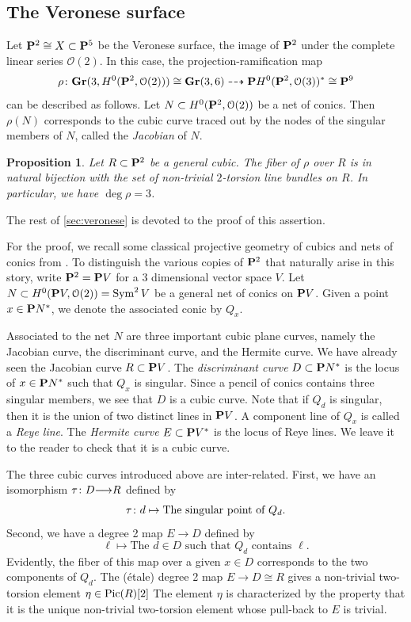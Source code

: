 \documentclass[11pt,reqno]{amsart}
\theoremstyle{plain}
\newtheorem{proposition}[theorem]{Proposition}
\theoremstyle{definition}
\theoremstyle{remark}
\numberwithin{equation}{section}
\renewcommand{\to}{{\longrightarrow}}
\numberwithin{equation}{section}
\renewcommand{\O}{\mathcal O}
\begin{document}
\subsection{The Veronese surface} %
\label{sec:veronese}
Let $\P^{2} \cong X \subset \P^{5}$ be the Veronese surface, the image of $\P^2$ under the complete linear series $\O(2)$.
In this case, the projection-ramification map
\begin{align*}
  \rho \from  \Gr(3,H^0(\P^2, \O(2))) \cong \Gr(3, 6) \dashrightarrow \P H^0(\P^2, \O(3))^* \cong \P^9
\end{align*}
can be described as follows.
Let $N \subset H^0(\P^2, \O(2))$ be a net of conics.
Then $\rho(N)$ corresponds to the cubic curve traced out by the nodes of the singular members of $N$, called the \emph{Jacobian} of $N$.
\begin{proposition}\label{prop:veronese}
  Let $R \subset \P^2$ be a general cubic.
  The fiber of $\rho$ over $R$ is in natural bijection with the set of non-trivial $2$-torsion line bundles on $R$.
  In particular, we have $\deg \rho = 3$.
\end{proposition}
The rest of \autoref{sec:veronese} is devoted to the proof of this assertion.

For the proof, we recall some classical projective geometry of cubics and nets of conics from \cite[\S~3]{dol:12}.
To distinguish the various copies of $\P^2$ that naturally arise in this story, write $\P^2 = \P V$ for a 3 dimensional vector space $V$.
Let $N \subset H^0(\P V, \O(2)) = \Sym^2V$ be a general net of conics on $\P V$.
Given a point $x \in \P N^*$, we denote the associated conic by $Q_x$.

Associated to the net $N$ are three important cubic plane curves, namely the Jacobian curve, the discriminant curve, and the Hermite curve.
We have already seen the Jacobian curve $R \subset \P V$.
The \emph{discriminant curve} $D \subset \P N^*$ is the locus of $x \in \P N^*$ such that $Q_x$ is singular.
Since a pencil of conics contains three singular members, we see that $D$ is a cubic curve.
Note that if $Q_d$ is singular, then it is the union of two distinct lines in $\P V$.
A component line of $Q_x$ is called a \emph{Reye line}.
The \emph{Hermite curve} $E \subset \P V^*$ is the locus of Reye lines.
We leave it to the reader to check that it is a cubic curve.

The three cubic curves introduced above are inter-related.
First, we have an isomorphism $\tau \from D \to R$ defined by
\begin{equation}\label{eqn:DR}
  \tau \from d \mapsto \text{The singular point of $Q_d$}.
\end{equation}
Second, we have a degree 2 map $E \to D$ defined by
\[ \ell \mapsto \text{The $d \in D$ such that $Q_d$ contains $\ell$}.\]
Evidently, the fiber of this map over a given $x \in D$ corresponds to the two components of $Q_d$.
The (\'etale) degree 2 map $E \to D \cong R$ gives a non-trivial two-torsion element $\eta \in \Pic(R)[2]$
The element $\eta$ is characterized by the property that it is the unique non-trivial two-torsion element whose pull-back to $E$ is trivial.
\end{document}
